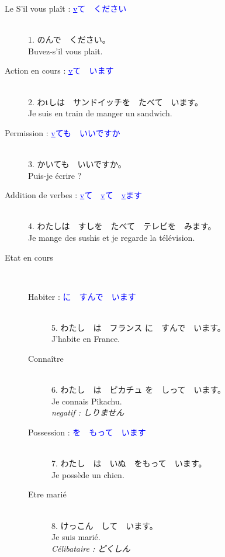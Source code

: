 \documentclass[11pt]{report}
\newenvironment{Japanese}{%
\CJKfamily{min}%
\CJKtilde  
\CJKnospace}{}
\begin{document}
\begin{CJK}{UTF8}{}  
\begin{Japanese}
	\begin{description}
		\item[Le S'il vous plaît : \textcolor{blue}{\underline{v}て　ください}] \hfill \\
			1. のんで　ください。 \\
			Buvez-s'il vous plait.
		\item[Action en cours : \textcolor{blue}{\underline{v}て　います}] \hfill \\
			2. わtしは　サンドイッチを　たべて　います。 \\
			Je suis en train de manger un sandwich.
		\item[Permission : \textcolor{blue}{\underline{v}ても　いいですか}] \hfill \\
			3. かいても　いいですか。 \\
			Puis-je écrire ?
		\item[Addition de verbes : \textcolor{blue}{\underline{v}て　\underline{v}て　\underline{v}ます}] \hfill \\
			4. わたしは　すしを　たべて　テレビを　みます。 \\
			Je mange des sushis et je regarde la télévision.  \\
			\item[Etat en cours] \hfill \\
			\begin{description}
				\item[Habiter : \textcolor{blue}{\underline{\qquad} に　すんで　います}] \hfill \\
				5. わたし　は　フランス に　すんで　います。 \\
				J'habite en France.
				\item[Connaître] \hfill \\
				6. わたし　は　ピカチュ を　しって　います。 \\
				Je connais Pikachu. \\
				\emph{negatif : しりません}
				\item[Possession : \textcolor{blue}{\underline{\qquad}を　もって　います}] \hfill \\
				7. わたし　は　いぬ　をもって　います。 \\
				Je possède un chien.
				\item[Etre mari\'e] \hfill \\
				8. けっこん　して　います。 \\
				Je suis marié. \\
				\emph{Célibataire : どくしん}
			\end{description}
	\end{description}
\end{Japanese}  
\end{CJK}
\end{document}
